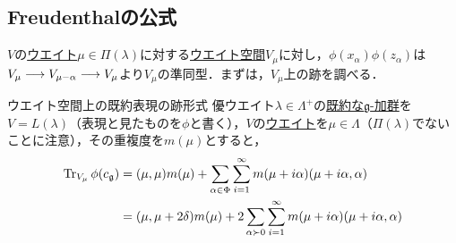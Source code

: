 \documentclass[rep_main]{subfiles}
\begin{document}
\subsection{Freudenthalの公式}
$V$の\hyperref[def:weight-rep]{ウエイト}$\mu \in \Pi(\lambda)$に対する\hyperref[def:weight-rep]{ウエイト空間}$V_\mu$に対し，$\phi(x_\alpha)\phi(z_\alpha)$は$V_\mu \longrightarrow V_{\mu - \alpha} \longrightarrow V_\mu$より$V_\mu$の準同型．まずは，$V_\mu$上の跡を調べる．
\begin{mylem}[label=lem:Freudenthal]{ウエイト空間上の既約表現の跡形式}
	優ウエイト$\lambda \in \Lambda^+$の\hyperref[thm:hwmodule-exist]{既約な$\mathfrak{g}$-加群}を$V = L(\lambda)$（表現と見たものを$\phi$と書く），$V$の\hyperref[def:weight-rep]{ウエイト}を$\mu \in \Lambda$（$\Pi(\lambda)$でないことに注意），その重複度を$m(\mu)$とすると，
	\begin{align}
		\Tr_{V_\mu} \phi(c_\mathfrak{g}) &= (\mu, \mu)m(\mu) + \sum_{\alpha \in \Phi} \sum_{i=1}^\infty m(\mu + i\alpha)(\mu + i\alpha, \alpha) \\
		&= (\mu, \mu + 2\delta)m(\mu) + 2\sum_{\alpha \succ 0} \sum_{i=1}^\infty m(\mu + i\alpha)(\mu + i\alpha, \alpha)
	\end{align}
\end{mylem}
\end{document}
